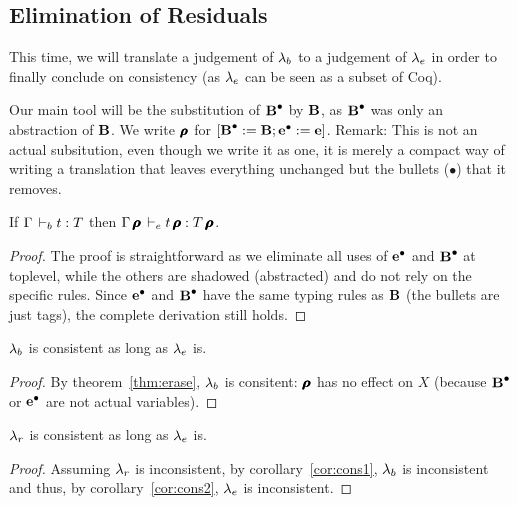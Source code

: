 \documentclass[a4paper,english]{lipics-utf8x}
\begin{document}
  \subsection{Elimination of Residuals}

  This time, we will translate a judgement of $\Sb$ to a judgement of $\Se$
  in order to finally conclude on consistency (as $\Se$ can be seen as a subset
  of Coq).

  Our main tool will be the substitution of $\operatorname{\operatorname{\mathbf{B}}^\bullet}$ by $\operatorname{\mathbf{B}}$, as $\operatorname{\operatorname{\mathbf{B}}^\bullet}$ was only
  an abstraction of $\operatorname{\mathbf{B}}$. We write $\operatorname{\pmb{\bm{\rho}}}$ for $[\operatorname{\operatorname{\mathbf{B}}^\bullet} := \operatorname{\mathbf{B}} ; \operatorname{\operatorname{\mathbf{e}}^\bullet} := \operatorname{\mathbf{e}}]$.
  Remark: This is not an actual subsitution, even though we write it as one,
  it is merely a compact way of writing a translation that leaves everything
  unchanged but the bullets ($\bullet$) that it removes.

  \begin{theorem}[Erasure ($\Sb$ to $\Se$)]
    \label{thm:erase}
    If $\Gamma \,\vdash_b t : T$ then $\Gamma\operatorname{\pmb{\bm{\rho}}} \,\vdash_e t\operatorname{\pmb{\bm{\rho}}} : T\operatorname{\pmb{\bm{\rho}}}$.
  \end{theorem}

  \begin{proof}
    The proof is straightforward as we eliminate all uses of $\operatorname{\operatorname{\mathbf{e}}^\bullet}$ and $\operatorname{\operatorname{\mathbf{B}}^\bullet}$
    at toplevel, while the others are shadowed (abstracted) and do not rely
    on the specific rules. Since $\operatorname{\operatorname{\mathbf{e}}^\bullet}$ and $\operatorname{\operatorname{\mathbf{B}}^\bullet}$ have the same typing rules
    as $\operatorname{\mathbf{B}}$ (the bullets are just tags), the complete derivation still holds.
  \end{proof}

  \begin{corollary}[Consistency of $\Sb$]
    \label{cor:cons2}
    $\Sb$ is consistent as long as $\Se$ is.
  \end{corollary}

  \begin{proof}
    By theorem~\ref{thm:erase}, $\Sb$ is consitent: $\operatorname{\pmb{\bm{\rho}}}$ has no effect on
    $X$ (because $\operatorname{\operatorname{\mathbf{B}}^\bullet}$ or $\operatorname{\operatorname{\mathbf{e}}^\bullet}$ are not actual variables).
  \end{proof}

  \begin{corollary}[Consitency]
    $\lambda_r$ is consistent as long as $\Se$ is.
  \end{corollary}

  \begin{proof}
    Assuming $\lambda_r$ is inconsistent, by corollary~\ref{cor:cons1},
    $\Sb$ is inconsistent and thus, by corollary~\ref{cor:cons2},
    $\Se$ is inconsistent.
  \end{proof}
\end{document}
